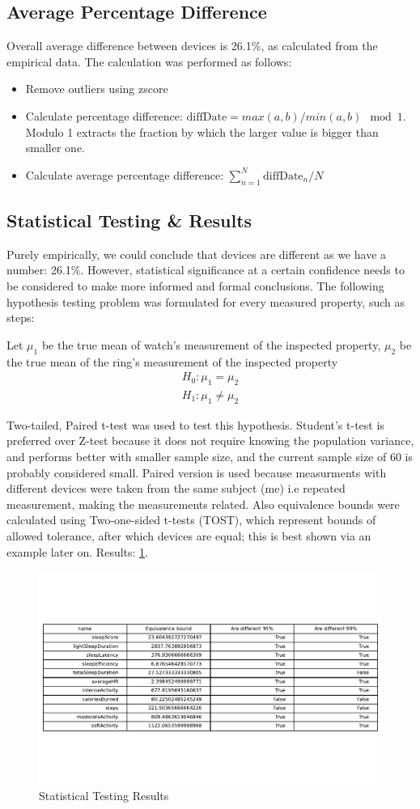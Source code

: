 \subsection{Average Percentage Difference}
Overall average difference between devices is 26.1\%, as calculated from the empirical data. The calculation was performed as follows: 
\begin{itemize}
    \item Remove outliers using zscore
    \item Calculate percentage difference: $\text{diffDate} = max(a,b) / min(a,b) \mod 1$. Modulo 1 extracts the fraction by which the larger value is bigger than smaller one.
    \item Calculate average percentage difference: $\sum_{n=1}^{N} \text{diffDate}_n / N$
\end{itemize}
\subsection{Statistical Testing \& Results}
Purely empirically, we could conclude that devices are different as we have a number: 26.1\%. However, statistical significance at a certain confidence needs to be considered to make more informed and formal conclusions. The following hypothesis testing problem was formulated for every measured property, such as steps: 

Let $\mu_1$ be the true mean of watch's measurement of the inspected property, $\mu_2$ be the true mean of the ring's measurement of the inspected property
\begin{align*}
    H_0:\mu_1 = \mu_2 \\
    H_1: \mu_1 \neq \mu_2
\end{align*}


Two-tailed, Paired t-test was used to test this hypothesis. Student's t-test is preferred over Z-test because it does not require knowing the population variance, and performs better with smaller sample size, and the current sample size of 60 is probably considered small. Paired version is used because measurments with different devices were taken from the same subject (me) i.e repeated measurement, making the measurements related. Also equivalence bounds were calculated using Two-one-sided t-tests (TOST), which represent bounds of allowed tolerance, after which devices are equal; this is best shown via an example later on. Results: \ref{fig:results}.

\begin{figure}
    
    \centering
    \includegraphics[width=\textwidth,keepaspectratio]{../images/results.pdf}
    \caption{Statistical Testing Results}
    \label{fig:results}
    
\end{figure}